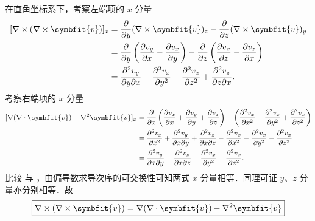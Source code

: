 \begin{myproof}

    在直角坐标系下，考察左端项的 $x$ 分量
    \begin{equation}\label{eq:curl-curl-lhs}
        \begin{aligned}
            \relax [\nabla \times (\nabla \times \symbfit{v})]_x & = \frac{\partial}{\partial y} (\nabla \times \symbfit{v})_z - \frac{\partial}{\partial z} (\nabla \times \symbfit{v})_y                                                                                                       \\
                                                                 & = \frac{\partial}{\partial y} \left( \frac{\partial v_y}{\partial x} - \frac{\partial v_x}{\partial y} \right) - \frac{\partial}{\partial z} \left( \frac{\partial v_x}{\partial z} - \frac{\partial v_z}{\partial x} \right) \\
                                                                 & = \frac{\partial^2 v_y}{\partial y \partial x} - \frac{\partial^2 v_x}{\partial y^2} - \frac{\partial^2 v_x}{\partial z^2} + \frac{\partial^2 v_z}{\partial z \partial x}.
        \end{aligned}
    \end{equation}
    考察右端项的 $x$ 分量
    \begin{equation}\label{eq:curl-curl-rhs}
        \begin{aligned}
            \relax [\nabla (\nabla \cdot \symbfit{v}) - \nabla^2 \symbfit{v}]_x & = \frac{\partial}{\partial x} \left( \frac{\partial v_x}{\partial x} + \frac{\partial v_y}{\partial y} + \frac{\partial v_z}{\partial z} \right) - \left( \frac{\partial^2 v_x}{\partial x^2} + \frac{\partial^2 v_x}{\partial y^2} + \frac{\partial^2 v_x}{\partial z^2} \right) \\
                                                                                & = \frac{\partial^2 v_x}{\partial x^2} + \frac{\partial^2 v_y}{\partial x \partial y} + \frac{\partial^2 v_z}{\partial x \partial z} - \frac{\partial^2 v_x}{\partial x^2} - \frac{\partial^2 v_x}{\partial y^2} - \frac{\partial^2 v_x}{\partial z^2}                             \\
                                                                                & = \frac{\partial^2 v_y}{\partial x \partial y} + \frac{\partial^2 v_z}{\partial x \partial z} - \frac{\partial^2 v_x}{\partial y^2} - \frac{\partial^2 v_x}{\partial z^2}.
        \end{aligned}
    \end{equation}
    比较  与 ，由偏导数求导次序的可交换性可知两式 $x$ 分量相等．同理可证 $y$、$z$ 分量亦分别相等．故
    \begin{equation}\label{eq:curl-curl-final}
        \boxed{\nabla \times (\nabla \times \symbfit{v}) = \nabla (\nabla \cdot \symbfit{v}) - \nabla^2 \symbfit{v}}
    \end{equation}
\end{myproof}

\endinput
